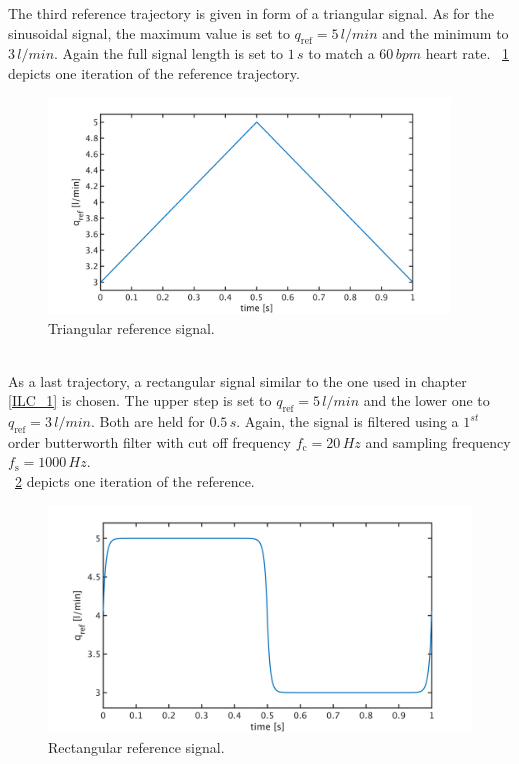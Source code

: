 The third reference trajectory is given in form of a triangular signal. As for the sinusoidal signal, the maximum value is set to $q_{\mathrm{ref}}=5\,l/min$ and the minimum to $3\, l/min$. Again the full signal length is set to $1\,s$ to match a $60\,bpm$ heart rate. \figurename~\ref{fig:ref_triang} depicts one iteration of the reference trajectory.
\begin{figure}[!ht]
  \centering
  \includegraphics[width=0.95\textwidth]{images/chapt_5/ILC/ref_triang.pdf}
  \caption[Triangular reference signal]{Triangular reference signal.}
  \label{fig:ref_triang}
\end{figure}
\\As a last trajectory, a rectangular signal similar to the one used in chapter \ref{ILC_1} is chosen. The upper step is set to $q_{\mathrm{ref}}=5\,l/min$ and the lower one to $q_{\mathrm{ref}}=3\,l/min$. Both are held for $0.5\,s$. Again, the signal is filtered using a $1^{st}$ order butterworth filter with cut off frequency $f_{\mathrm{c}}=20\,Hz$ and sampling frequency $f_{\mathrm{s}}=1000\,Hz$.
\\\figurename~\ref{fig:ref_square} depicts one iteration of the reference.
\begin{figure}[!ht]
  \centering
  \includegraphics[width=\textwidth]{images/chapt_5/ILC/ref_square.pdf}
  \caption[Rectangular reference signal]{Rectangular reference signal.}
  \label{fig:ref_square}
\end{figure}
